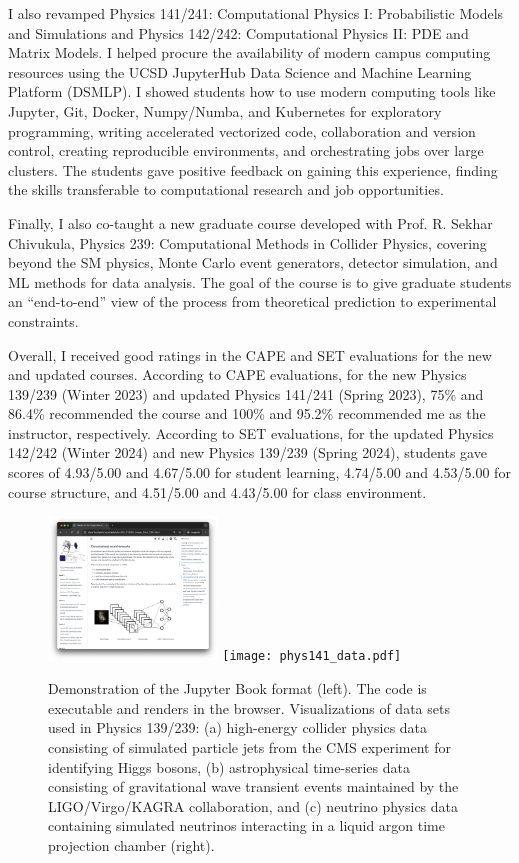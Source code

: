 \documentclass[11pt,letterpaper,notitlepage]{article}
\begin{document}
I also revamped Physics 141/241: Computational Physics I: Probabilistic Models and Simulations and Physics 142/242: Computational Physics II: PDE and Matrix Models.
I helped procure the availability of modern campus computing resources using the UCSD JupyterHub Data Science and Machine Learning Platform (DSMLP).
I showed students how to use modern computing tools like Jupyter, Git, Docker, Numpy/Numba, and Kubernetes for exploratory programming, writing accelerated vectorized code, collaboration and version control, creating reproducible environments, and orchestrating jobs over large clusters.
The students gave positive feedback on gaining this experience, finding the skills transferable to computational research and job opportunities.

Finally, I also co-taught a new graduate course developed with Prof. R. Sekhar Chivukula, Physics 239: Computational Methods in Collider Physics, covering beyond the SM physics, Monte Carlo event generators, detector simulation, and ML methods for data analysis.
The goal of the course is to give graduate students an ``end-to-end'' view of the process from theoretical prediction to experimental constraints.


Overall, I received good ratings in the CAPE and SET evaluations for the new and updated courses.
According to CAPE evaluations, for the new Physics 139/239 (Winter 2023) and updated Physics 141/241 (Spring 2023), 75\% and 86.4\% recommended the course and 100\% and 95.2\% recommended me as the instructor, respectively.
According to SET evaluations, for the updated Physics 142/242 (Winter 2024) and new Physics 139/239 (Spring 2024), students gave scores of 4.93/5.00 and 4.67/5.00 for student learning, 4.74/5.00 and 4.53/5.00 for course structure, and 4.51/5.00 and 4.43/5.00 for class environment.


\begin{figure}[htb]
    \centering
    \includegraphics[width=0.4\textwidth]{jupyterbook.png}
    \texttt{[image: phys141\_data.pdf]}
    \caption{Demonstration of the Jupyter Book format (left).
        The code is executable and renders in the browser.
        Visualizations of data sets used in Physics 139/239: (a) high-energy collider physics data consisting of simulated particle jets from the CMS experiment for identifying Higgs bosons, (b) astrophysical time-series data consisting of gravitational wave transient events maintained by the LIGO/Virgo/KAGRA collaboration, and (c) neutrino physics data containing simulated neutrinos interacting in a liquid argon time projection chamber (right).
        \label{fig:teaching}}
\end{figure}
\end{document}
